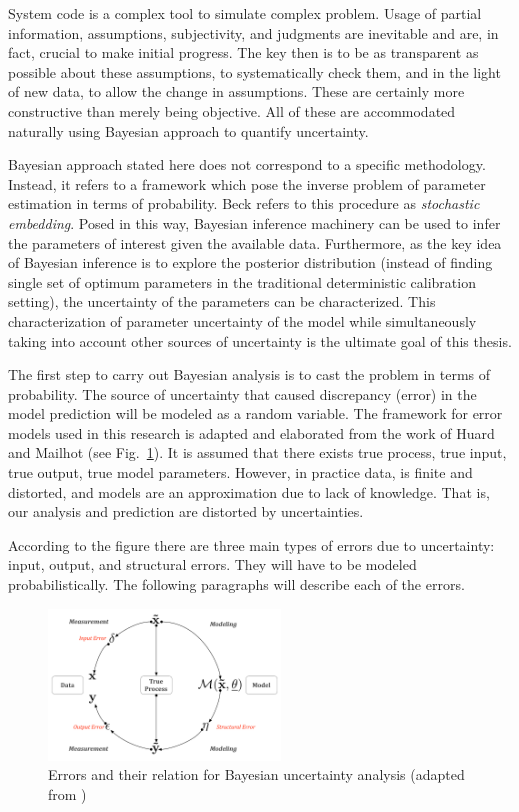 \documentclass[11pt,titlepage]{article}
\begin{document}
System code is a complex tool to simulate complex problem. 
Usage of partial information, assumptions, subjectivity, and judgments are inevitable and are, in fact, crucial to make initial progress. 
The key then is to be as transparent as possible about these assumptions, to systematically check them, and in the light of new data, to allow the change in assumptions. 
These are certainly more constructive than merely being objective. 
All of these are accommodated naturally using Bayesian approach to quantify uncertainty.

Bayesian approach stated here does not correspond to a specific methodology. 
Instead, it refers to a framework which pose the inverse problem of parameter estimation in terms of probability. 
Beck \cite{Beck2010} refers to this procedure as \emph{stochastic embedding}. 
Posed in this way, Bayesian inference machinery can be used to infer the parameters of interest given the available data. 
Furthermore, as the key idea of Bayesian inference is to explore the posterior distribution (instead of finding single set of optimum parameters in the traditional deterministic calibration setting), the uncertainty of the parameters can be characterized. 
This characterization of parameter uncertainty of the model while simultaneously taking into account other sources of uncertainty is the ultimate goal of this thesis. 

The first step to carry out Bayesian analysis is to cast the problem in terms of probability. 
The source of uncertainty that caused discrepancy (error) in the model prediction will be modeled as a random variable. 
The framework for error models used in this research is adapted and elaborated from the work of Huard and Mailhot \cite{HuardMailhot2006} (see Fig.~\ref{fig:HuardMailhot}). 
It is assumed that there exists true process, true input, true output, true model parameters. 
However, in practice data, is finite and distorted, and models are an approximation due to lack of knowledge. 
That is, our analysis and prediction are distorted by uncertainties. 

According to the figure there are three main types of errors due to uncertainty: input, output, and structural errors. 
They will have to be modeled probabilistically.
The following paragraphs will describe each of the errors.
\begin{figure}[htbp]
	\centering
	\includegraphics[width=0.55\textwidth]{HuardMailhot.pdf}
	\caption{Errors and their relation for Bayesian uncertainty analysis (adapted from \cite{HuardMailhot2006})}
	\label{fig:HuardMailhot}
\end{figure}
\end{document}
